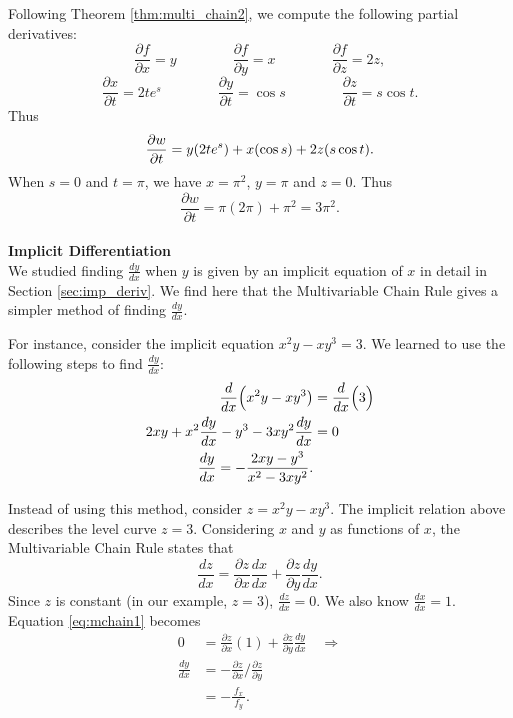 {Following Theorem \ref{thm:multi_chain2}, we compute the following partial derivatives:
$$\frac{\partial f}{\partial x} = y\qquad\qquad \frac{\partial f}{\partial y} = x\qquad\qquad \frac{\partial f}{\partial z} = 2z,$$
$$\frac{\partial x}{\partial t} = 2te^s\qquad\qquad \frac{\partial y}{\partial t} = \cos s\qquad\qquad \frac{\partial z}{\partial t} = s\cos t.$$
Thus $$\displaystyle \frac{\partial w}{\partial t} = y(2te^s) + x(\cos s) + 2z(s\cos t).$$ 
When $s=0$ and $t=\pi$, we have $x=\pi^2$, $y=\pi$ and $z=0$. Thus
$$\frac{\partial w}{\partial t} = \pi(2\pi) + \pi^2 = 3\pi^2.$$
\baselineskip
}\\

\noindent\textbf{\large Implicit Differentiation}\\

We studied finding $\frac{dy}{dx}$ when $y$ is given by an implicit equation of $x$ in detail in Section \ref{sec:imp_deriv}. We find here that the Multivariable Chain Rule gives a simpler method of finding $\frac{dy}{dx}$.

For instance, consider the implicit equation $x^2y-xy^3=3.$ We learned to use the following steps to find $\frac{dy}{dx}$:
\begin{align}
\frac{d}{dx}\Big(x^2y-xy^3\big) &= \frac{d}{dx}\Big(3\Big) \notag\\
2xy + x^2\frac{dy}{dx}-y^3-3xy^2\frac{dy}{dx} &= 0\notag \\
\frac{dy}{dx} = -\frac{2xy-y^3}{x^2-3xy^2}.\label{eq:mchain2}
\end{align}

Instead of using this method, consider $z=x^2y-xy^3$. The implicit relation above describes the level curve $z=3$. Considering $x$ and $y$ as functions of $x$, the Multivariable Chain Rule states that
\begin{equation}\frac{dz}{dx} = \frac{\partial z}{\partial x}\frac{dx}{dx}+\frac{\partial z}{\partial y}\frac{dy}{dx}.\label{eq:mchain1}\end{equation}
Since $z$ is constant (in our example, $z=3$), $\frac{dz}{dx} = 0$. We also know $\frac{dx}{dx} = 1$. Equation \eqref{eq:mchain1} becomes
\begin{align*}
0 &= \frac{\partial z}{\partial x}(1) + \frac{\partial z}{\partial y}\frac{dy}{dx} \quad \Rightarrow\\[5pt]
\frac{dy}{dx} &= -\frac{\partial z}{\partial x}\Big/\frac{\partial z}{\partial y}\\[5pt]
			&= -\frac{\,f_x\,}{f_y}.
\end{align*}

